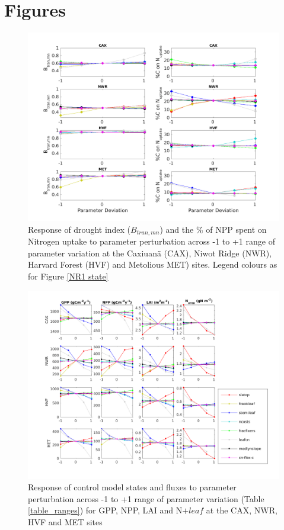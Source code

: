\documentclass[draft,linenumbers]{agujournal}
\begin{document}
\section{Figures}
\begin{figure}[h]
     \includegraphics[width=1.2\textwidth]{matlab/figures/MAY19jp_MEANCOND_-r200_1999.png}
     \caption{Response of drought index ($B_{tran,mn}$) and the \% of NPP spent on Nitrogen uptake to parameter perturbation across -1 to +1 range of parameter variation at the Caxiuan\~a (CAX), Niwot Ridge (NWR), Harvard Forest (HVF) and Metolious MET) sites. Legend colours as for Figure \ref{NR1 state}}
     \label{btran state}
 \end{figure}
 
 \begin{figure}[h]
     \includegraphics[width=1.2\textwidth]{matlab/figures/MAY19jp_STATE_y1999.png}
     \caption{Response of control model states and fluxes to parameter perturbation across -1 to +1 range of parameter variation (Table \ref{table_ranges}) for GPP, NPP, LAI and N$+{leaf}$ at the CAX, NWR, HVF and MET sites}
     \label{state}
 \end{figure}
\end{document}
